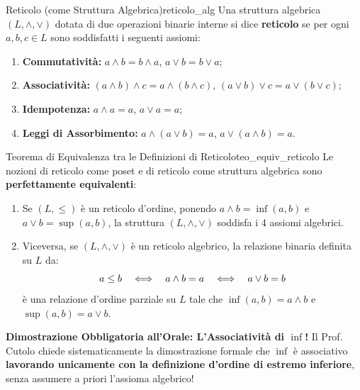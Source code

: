 \begin{definizione}{Reticolo (come Struttura Algebrica)}{reticolo_alg}
Una struttura algebrica $(L, \wedge, \vee)$ dotata di due operazioni binarie interne si dice \textbf{reticolo} se per ogni $a, b, c \in L$ sono soddisfatti i seguenti assiomi:
\begin{enumerate}
    \item \textbf{Commutatività:} $a \wedge b = b \wedge a$, \quad $a \vee b = b \vee a$;
    \item \textbf{Associatività:} $(a \wedge b) \wedge c = a \wedge (b \wedge c)$, \quad $(a \vee b) \vee c = a \vee (b \vee c)$;
    \item \textbf{Idempotenza:} $a \wedge a = a$, \quad $a \vee a = a$;
    \item \textbf{Leggi di Assorbimento:} $a \wedge (a \vee b) = a$, \quad $a \vee (a \wedge b) = a$.
\end{enumerate}
\end{definizione}

\begin{teorema}{Teorema di Equivalenza tra le Definizioni di Reticolo}{teo_equiv_reticolo}
Le nozioni di reticolo come poset e di reticolo come struttura algebrica sono \textbf{perfettamente equivalenti}:
\begin{enumerate}
    \item Se $(L, \le)$ è un reticolo d'ordine, ponendo $a \wedge b = \inf(a, b)$ e $a \vee b = \sup(a, b)$, la struttura $(L, \wedge, \vee)$ soddisfa i 4 assiomi algebrici.
    \item Viceversa, se $(L, \wedge, \vee)$ è un reticolo algebrico, la relazione binaria definita su $L$ da:
    \[
        a \le b \quad \Longleftrightarrow \quad a \wedge b = a \quad \Longleftrightarrow \quad a \vee b = b
    \]
    è una relazione d'ordine parziale su $L$ tale che $\inf(a, b) = a \wedge b$ e $\sup(a, b) = a \vee b$.
\end{enumerate}
\end{teorema}

\begin{avvisoCutolo}
    \textbf{Dimostrazione Obbligatoria all'Orale: L'Associatività di $\inf$!}
    Il Prof. Cutolo chiede sistematicamente la dimostrazione formale che $\inf$ è associativo \textbf{lavorando unicamente con la definizione d'ordine di estremo inferiore}, senza assumere a priori l'assioma algebrico!
\end{avvisoCutolo}

